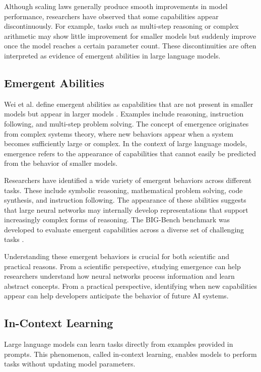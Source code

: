 \documentclass[conference]{IEEEtran}
\begin{document}
Although scaling laws generally produce smooth improvements in model performance, researchers have observed that some capabilities appear discontinuously. For example, tasks such as multi-step reasoning or complex arithmetic may show little improvement for smaller models but suddenly improve once the model reaches a certain parameter count. These discontinuities are often interpreted as evidence of emergent abilities in large language models.

\subsection{Emergent Abilities}

Wei et al. define emergent abilities as capabilities that are not present in smaller models but appear in larger models \cite{wei2022emergent}. Examples include reasoning, instruction following, and multi-step problem solving.
The concept of emergence originates from complex systems theory, where new behaviors appear when a system becomes sufficiently large or complex. In the context of large language models, emergence refers to the appearance of capabilities that cannot easily be predicted from the behavior of smaller models.

Researchers have identified a wide variety of emergent behaviors across different tasks. These include symbolic reasoning, mathematical problem solving, code synthesis, and instruction following. The appearance of these abilities suggests that large neural networks may internally develop representations that support increasingly complex forms of reasoning.
The BIG-Bench benchmark was developed to evaluate emergent capabilities across a diverse set of challenging tasks \cite{srivastava2022bigbench}.

Understanding these emergent behaviors is crucial for both scientific and practical reasons. From a scientific perspective, studying emergence can help researchers understand how neural networks process information and learn abstract concepts. From a practical perspective, identifying when new capabilities appear can help developers anticipate the behavior of future AI systems.

\subsection{In-Context Learning}

Large language models can learn tasks directly from examples provided in prompts. This phenomenon, called in-context learning, enables models to perform tasks without updating model parameters.
\end{document}
